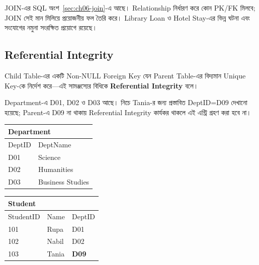 JOIN-এর SQL অংশ~\ref{sec:ch06-join}-এ আছে। Relationship নির্ধারণ করে কোন PK/FK মিলবে; JOIN সেই মান মিলিয়ে প্রয়োজনীয় ফল তৈরি করে। Library Loan ও Hotel Stay-এর ভিন্ন ঘটনা এবং সংযোগের নমুনা সংরক্ষিত প্রয়োগে রয়েছে।

\subsection{Referential Integrity}

\begin{definitionbox}{}

Child Table-এর একটি Non-NULL Foreign Key যেন Parent Table-এর
বিদ্যমান Unique Key-কে নির্দেশ করে---এই সামঞ্জস্যের বিধিকে
\textbf{Referential Integrity} বলে।

\end{definitionbox}


Department-এ D01, D02 ও D03 আছে। নিচে Tania-র জন্য প্রস্তাবিত
DeptID=D09 দেখানো হয়েছে; Parent-এ D09 না থাকায় Referential Integrity
কার্যকর থাকলে এই এন্ট্রি গ্রহণ করা হবে না।

\begin{flushleft}
\small
\renewcommand{\arraystretch}{1.08}

\begin{minipage}[t]{0.34\linewidth}
\raggedright

\begin{tabular}{|l|l|}
\hline
\multicolumn{2}{|l|}{\textbf{Department}}\\
\hline
DeptID & DeptName\\
\hline
D01 & Science\\\hline
D02 & Humanities\\\hline
D03 & Business Studies\\
\hline
\end{tabular}

\end{minipage}
\hfill
\begin{minipage}[t]{0.56\linewidth}
\raggedright

\begin{tabular}{|l|l|l|}
\hline
\multicolumn{3}{|l|}{\textbf{Student}}\\
\hline
StudentID & Name & DeptID\\
\hline
101 & Rupa & D01\\\hline
102 & Nabil & D02\\\hline
103 & Tania & \textbf{D09}\\
\hline
\end{tabular}

\end{minipage}

\end{flushleft}


